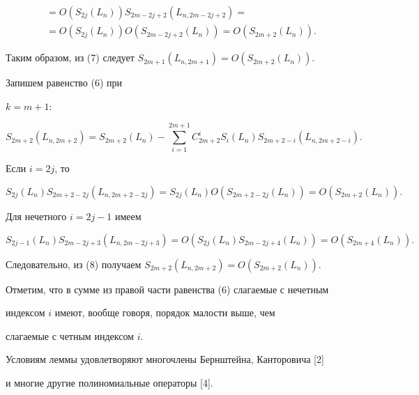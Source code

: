 \begin{pf}
\begin{multline*}
=O(S_{2j}(L_n))S_{2m-2j+2}(L_{n,2m-2j+2})= \\ 


% 


=O(S_{2j}(L_n))O(S_{2m-2j+2}(L_n))=O(S_{2m+2}(L_n)). 


\end{multline*} 


Таким образом, из (7) следует $S_{2m+1}(L_{n,2m+1})=O(S_{2m+2}(L_n))$. 


Запишем равенство (6) при 


$k=m+1$: 


\begin{equation} 


S_{2m+2}(L_{n,2m+2})=S_{2m+2}(L_n)-\sum^{2m+1}_{i=1} 


C^i_{2m+2}S_i(L_n)S_{2m+2-i}(L_{n,2m+2-i}). 


\end{equation} 


Если $i=2j$, то 


$$ 


S_{2j}(L_n)S_{2m+2-2j}(L_{n,2m+2-2j})=S_{2j}(L_n) 


O(S_{2m+2-2j}(L_n))=O(S_{2m+2}(L_n)). 


$$ 


Для нечетного $i=2j-1$ имеем 


$$ 


S_{2j-1}(L_n)S_{2m-2j+3}(L_{n,2m-2j+3})=O(S_{2j}(L_n) 


S_{2m-2j+4}(L_n))=O(S_{2m+4}(L_n)). 


$$ 


Следовательно, из (8) получаем $S_{2m+2}(L_{n,2m+2})=O(S_{2m+2}(L_n))$. 


\end{pf} 


 


\begin{note} 


Отметим, что в сумме из правой части равенства (6) слагаемые с нечетным 


индексом $i$ имеют, вообще говоря, порядок малости выше, чем 


слагаемые с четным индексом $i$. 


\end{note} 


 


\begin{note} 


Условиям леммы удовлетворяют многочлены Бернштейна, Канторовича [2] 


и многие другие полиномиальные операторы [4]. 


\end{note} 


